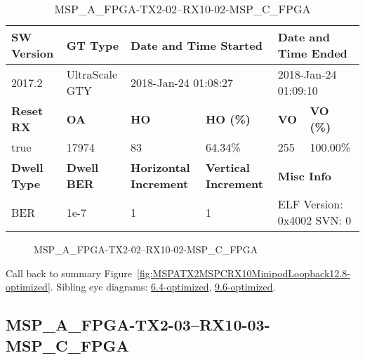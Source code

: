 \begin{table}[h]
\centering
\caption{MSP\_A\_FPGA-TX2-02--RX10-02-MSP\_C\_FPGA}
\label{tab:MSPAFPGATX202RX1002MSPCFPGA12.8-optimized}
\begin{tabular}{@{}|l|l|l|l|l|l|@{}}
\toprule
\textbf{SW Version}                & \textbf{GT Type}   & \multicolumn{2}{l|}{\textbf{Date and Time Started}}            & \multicolumn{2}{l|}{\textbf{Date and Time Ended}}        \\ \midrule
2017.2                       & UltraScale GTY          & \multicolumn{2}{l|}{2018-Jan-24 01:08:27}                   & \multicolumn{2}{l|}{2018-Jan-24 01:09:10}               \\ \midrule
\textbf{Reset RX}                  & \textbf{OA} & \textbf{HO}   & \textbf{HO (\%)} & \textbf{VO} & \textbf{VO (\%)} \\ \midrule
true & 17974        & 83          & 64.34\%        & 255        & 100.00\%       \\ \midrule
\textbf{Dwell Type}                & \textbf{Dwell BER} & \textbf{Horizontal Increment} & \textbf{Vertical Increment}    & \multicolumn{2}{l|}{\textbf{Misc Info}}                  \\ \midrule
BER                            & 1e-7        & 1        & 1           & \multicolumn{2}{l|}{ELF Version: 0x4002 SVN: 0}                         \\ \bottomrule
\end{tabular}
\end{table}

\begin{figure}[h]
\caption{MSP\_A\_FPGA-TX2-02--RX10-02-MSP\_C\_FPGA} \label{fig:MSPAFPGATX202RX1002MSPCFPGA12.8-optimized}
\end{figure}

Call back to summary Figure~\ref{fig:MSPATX2MSPCRX10MinipodLoopback12.8-optimized}.
Sibling eye diagrams: \hyperref[sec:MSPAFPGATX202RX1002MSPCFPGA6.4-optimized]{6.4-optimized}, \hyperref[sec:MSPAFPGATX202RX1002MSPCFPGA9.6-optimized]{9.6-optimized}.

\clearpage
\newpage


\subsection{MSP\_A\_FPGA-TX2-03--RX10-03-MSP\_C\_FPGA}\label{sec:MSPAFPGATX203RX1003MSPCFPGA12.8-optimized}

